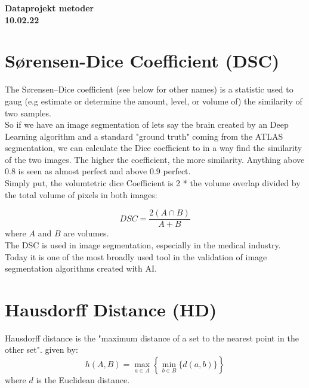 \documentclass[a4paper, 11pt]{report}
\begin{document}
	
	
	\thispagestyle{empty}
	\setcounter{page}{1}
	
	
	\begin{center}
		\huge
		\textbf{Dataprojekt metoder}\\
		\small
		\textbf{10.02.22}
	\end{center}


\section*{Sørensen-Dice Coefficient (DSC)}

The Sørensen–Dice coefficient (see below for other names) is a statistic used to gaug (e.g estimate or determine the amount, level, or volume of) the similarity of two samples. \\

So if we have an image segmentation of lets say the brain created by an Deep Learning algorithm and a standard "ground truth" coming from the ATLAS segmentation, we can calculate the Dice coefficient to in a way find the similarity of the two images. The higher the coefficient, the more similarity. Anything above 0.8 is seen as almost perfect and above 0.9 perfect. \\

Simply put, the volumtetric dice Coefficient is 2 * the volume overlap divided by the total volume of pixels in both images:

$$
DSC = \frac{2(A \cap B)}{A+B}
$$
where $A$ and $B$ are volumes.\\

The DSC is used in image segmentation, especially in the medical industry. Today it is one of the most broadly used tool in the validation of image segmentation algorithms created with AI.

\section*{Hausdorff Distance (HD)}

Hausdorff distance is the "maximum distance of a set to the nearest point in the other set". given by:\\
$$
h(A, B)=\max _{a \in A}\left\{\min _{b \in B}\{d(a, b)\}\right\}
$$ where $d$ is the Euclidean distance. \\
\end{document}
